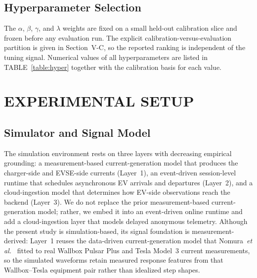 \documentclass{ieeeaccess}
\begin{document}
    \subsection{Hyperparameter Selection}
    The $\alpha$, $\beta$, $\gamma$, and $\lambda$ weights are fixed on a small held-out calibration slice and frozen before any evaluation run.
    The explicit calibration-versus-evaluation partition is given in Section~V-C, so the reported ranking is independent of the tuning signal.
    Numerical values of all hyperparameters are listed in TABLE~\ref{table:hyper} together with the calibration basis for each value.

    \section{EXPERIMENTAL SETUP}

    \subsection{Simulator and Signal Model}

    The simulation environment rests on three layers with decreasing empirical grounding: a measurement-based current-generation model that produces the charger-side and EVSE-side currents (Layer~1), an event-driven session-level runtime that schedules asynchronous EV arrivals and departures (Layer~2), and a cloud-ingestion model that determines how EV-side observations reach the backend (Layer~3).
    We do not replace the prior measurement-based current-generation model; rather, we embed it into an event-driven online runtime and add a cloud-ingestion layer that models delayed anonymous telemetry.
    Although the present study is simulation-based, its signal foundation is measurement-derived: Layer~1 reuses the data-driven current-generation model that Nomura~\textit{et al.}~\cite{b14} fitted to real Wallbox Pulsar Plus and Tesla Model~3 current measurements, so the simulated waveforms retain measured response features from that Wallbox--Tesla equipment pair rather than idealized step shapes.
\end{document}
